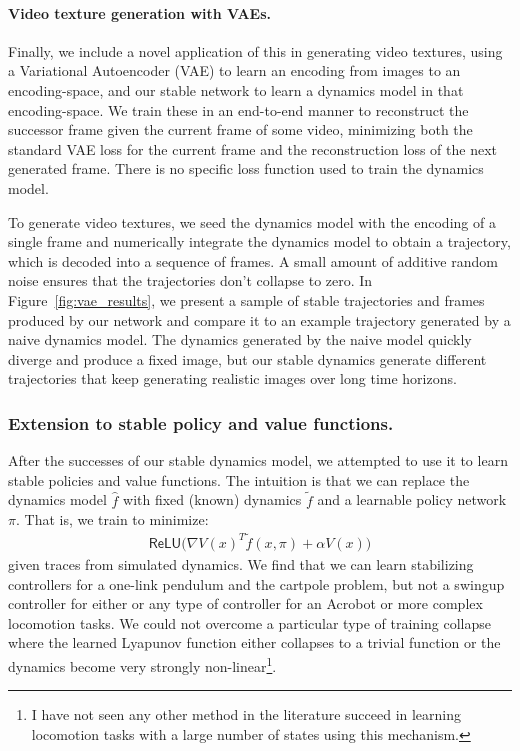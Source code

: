 \documentclass[11pt]{article}
\begin{document}
\paragraph{Video texture generation with VAEs. } Finally, we include a novel application of this in generating video textures, using a Variational Autoencoder (VAE) \citep{kingma2013auto} to learn an encoding from images to an encoding-space, and our stable network to learn a dynamics model in that encoding-space. We train these in an end-to-end manner to reconstruct the successor frame given the current frame of some video, minimizing both the standard VAE loss for the current frame and the reconstruction loss of the next generated frame. There is no specific loss function used to train the dynamics model.

To generate video textures, we seed the dynamics model with the encoding of a single frame and numerically integrate the dynamics model to obtain a trajectory, which is decoded into a sequence of frames. A small amount of additive random noise ensures that the trajectories don't collapse to zero. In Figure~\ref{fig:vae_results}, we present a sample of stable trajectories and frames produced by our network and compare it to an example trajectory generated by a naive dynamics model. The dynamics generated by the naive model quickly diverge and produce a fixed image, but our stable dynamics generate different trajectories that keep generating realistic images over long time horizons.

\subsubsection{Extension to stable policy and value functions. }

After the successes of our stable dynamics model, we attempted to use it to learn stable policies and value functions. The intuition is that we can replace the dynamics model $\hat f$ with fixed (known) dynamics $\tilde f$ and a learnable policy network $\pi$. That is, we train to minimize:
\begin{align}
  \mathsf{ReLU}\bigl(\nabla V(x)^T \tilde{f}(x, \pi) + \alpha V (x) \bigr)
\end{align}
given traces from simulated dynamics. We find that we can learn stabilizing controllers for a one-link pendulum and the cartpole problem, but not a swingup controller for either or any type of controller for an Acrobot or more complex locomotion tasks. We could not overcome a particular type of training collapse where the learned Lyapunov function either collapses to a trivial function or the dynamics become very strongly non-linear\footnote{I have not seen any other method in the literature succeed in learning locomotion tasks with a large number of states using this mechanism. }.
\end{document}
